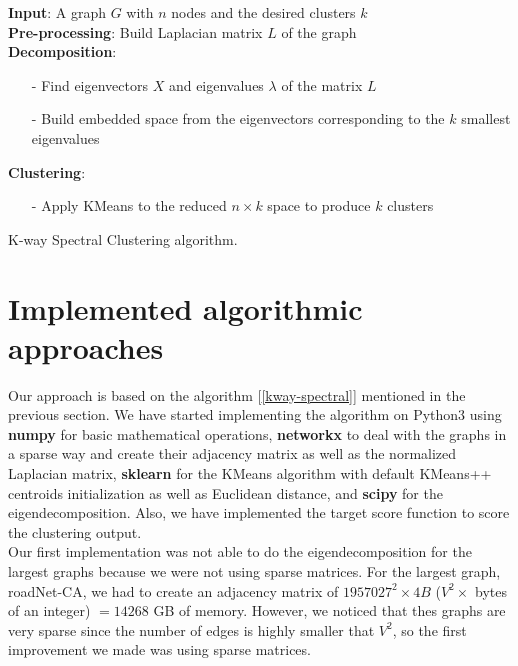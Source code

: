 \documentclass[11pt]{extarticle}
\begin{document}
\begin{algorithm}[H]
\textbf{Input}: A graph $G$ with $n$ nodes and the desired clusters $k$\\
\textbf{Pre-processing}: Build Laplacian matrix $L$ of the graph\\
\textbf{Decomposition}:
\begin{itemize}
    \item[-] Find eigenvectors $X$ and eigenvalues $\lambda$ of the matrix $L$
    \item[-] Build embedded space from the eigenvectors corresponding to the $k$ smallest eigenvalues
\end{itemize}
\textbf{Clustering}:
\begin{itemize}
    \item[-] Apply KMeans to the reduced $n \times k$ space to produce $k$ clusters
\end{itemize}
\label{kway-spectral}
\caption{K-way Spectral Clustering algorithm.}
\end{algorithm} \vspace{0.5cm}

\section{Implemented algorithmic approaches}

Our approach is based on the algorithm [\ref{kway-spectral}] mentioned in the previous section. We have started implementing the algorithm on Python3 using \textbf{numpy} for basic mathematical operations, \textbf{networkx} to deal with the graphs in a sparse way and create their adjacency matrix as well as the normalized Laplacian matrix, \textbf{sklearn} for the KMeans algorithm with default KMeans++ centroids initialization as well as Euclidean distance, and \textbf{scipy} for the eigendecomposition. Also, we have implemented the target score function to score the clustering output.\\

Our first implementation was not able to do the eigendecomposition for the largest graphs because we were not using sparse matrices. For the largest graph, roadNet-CA, we had to create an adjacency matrix of $1957027^2 \times 4B$  ($V^2 \times$ bytes of an integer) $ = 14268$ GB of memory. However, we noticed that thes graphs are very sparse since the number of edges is highly smaller that $V^2$, so the first improvement we made was using sparse matrices.\\
\end{document}
